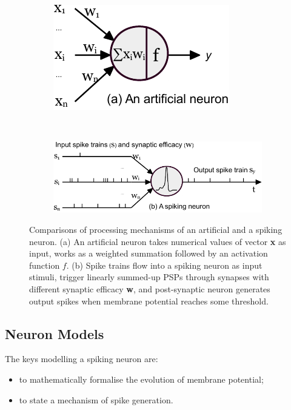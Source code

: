	\begin{figure}[tb!]
		\centering
		\begin{subfigure}[t]{0.28\textwidth}
			\includegraphics[width=\textwidth]{pics_snn/neuron_ann.pdf}
			\end{subfigure}~
		\begin{subfigure}[t]{0.65\textwidth}
			\includegraphics[width=\textwidth]{pics_snn/neuron_snn.pdf}
			\end{subfigure}
		\caption{Comparisons of processing mechanisms of an artificial and a spiking neuron. (a) An artificial neuron takes numerical values of vector \textbf{x} as input, works as a weighted summation followed by an activation function $f$. (b) Spike trains flow into a spiking neuron as input stimuli, trigger linearly summed-up PSPs through synapses with different synaptic efficacy \textbf{w}, and post-synaptic neuron generates output spikes when membrane potential reaches some threshold.}
		\label{Fig:compare_as}
	\end{figure}
	
\subsection{Neuron Models}
\label{subsec:neuron_model}
The keys \protect{} \protect{} modelling a spiking neuron are: 
\begin{itemize}
	\item to mathematically formalise the evolution of \protect{} membrane potential;
	\item to state a mechanism of spike generation.
\end{itemize}

